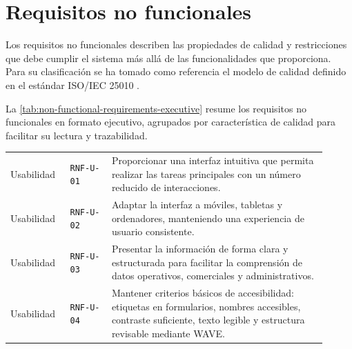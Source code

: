 \section{Requisitos no funcionales}
\label{sec:NonFunctionalRequirements}

Los requisitos no funcionales describen las propiedades de calidad y restricciones que debe cumplir el sistema más allá de las funcionalidades que proporciona. Para su clasificación se ha tomado como referencia el modelo de calidad definido en el estándar ISO/IEC 25010 \cite{iso25010}.

La \autoref{tab:non-functional-requirements-executive} resume los requisitos no funcionales en formato ejecutivo, agrupados por característica de calidad para facilitar su lectura y trazabilidad.

{\scriptsize
\setlength{\parskip}{0pt}
\setlength{\tabcolsep}{3pt}
\renewcommand{\arraystretch}{1.10}
\newcommand{\RNFCategoryHeader}[1]{%
\hline
\rowcolor{black!8}
\multicolumn{3}{|>{\raggedright\arraybackslash}p{0.91\linewidth}|}{\textbf{#1}}\\
\hline
}
\begin{supertabular}{|>{\raggedright\arraybackslash}p{0.17\linewidth}|>{\raggedright\arraybackslash}p{0.12\linewidth}|>{\raggedright\arraybackslash}p{0.62\linewidth}|}
\RNFCategoryHeader{RNF1. Usabilidad}
Usabilidad & \texttt{RNF-U-01} & Proporcionar una interfaz intuitiva que permita realizar las tareas principales con un número reducido de interacciones. \\
\hline
Usabilidad & \texttt{RNF-U-02} & Adaptar la interfaz a móviles, tabletas y ordenadores, manteniendo una experiencia de usuario consistente. \\
\hline
Usabilidad & \texttt{RNF-U-03} & Presentar la información de forma clara y estructurada para facilitar la comprensión de datos operativos, comerciales y administrativos. \\
\hline
Usabilidad & \texttt{RNF-U-04} & Mantener criterios básicos de accesibilidad: etiquetas en formularios, nombres accesibles, contraste suficiente, texto legible y estructura revisable mediante WAVE. \\

\end{supertabular}}
